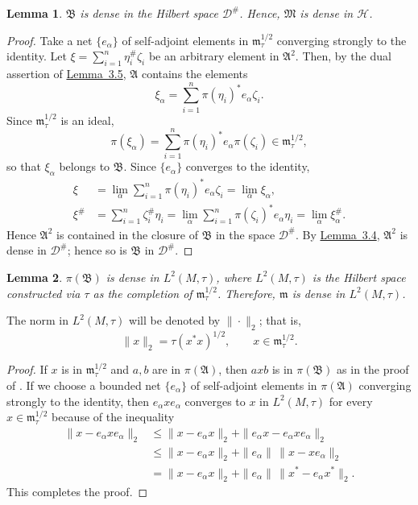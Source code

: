 \documentclass[12pt,b5paper,twoside]{article}
\theoremstyle{takesaki}
\newtheorem{lemma}{Lemma}[section]
\numberwithin{equation}{section}
\begin{document}
\begin{lemma}\label{lem:14.7}
$\mathfrak B$ is dense in the Hilbert space $\mathcal D^{\#}$.
Hence, $\mathfrak M$ is dense in $\mathcal H$.
\end{lemma}

\begin{proof}
Take a net $\{e_\alpha\}$ of self-adjoint elements in
$\mathfrak m_\tau^{1/2}$ converging strongly to the identity.  Let
$\xi=\sum_{i=1}^{n}\eta_i^{\#}\zeta_i$ be an arbitrary element in
$\mathfrak A^2$.  Then, by the dual assertion of
\hyperref[lem:3.5]{Lemma~3.5},
$\mathfrak A$ contains the elements
\[
 \xi_\alpha=\sum_{i=1}^{n}\pi(\eta_i)^*e_\alpha\zeta_i.
\]
Since $\mathfrak m_\tau^{1/2}$ is an ideal,
\[
 \pi(\xi_\alpha)
 =\sum_{i=1}^{n}\pi(\eta_i)^*e_\alpha\pi(\zeta_i)
 \in\mathfrak m_\tau^{1/2},
\]
so that $\xi_\alpha$ belongs to $\mathfrak B$.  Since
$\{e_\alpha\}$ converges to the identity,
\begin{align*}
 \xi
 &=\lim_\alpha\sum_{i=1}^{n}\pi(\eta_i)^*e_\alpha\zeta_i
  =\lim_\alpha\xi_\alpha,\\
 \xi^{\#}
 &=\sum_{i=1}^{n}\zeta_i^{\#}\eta_i
  =\lim_\alpha\sum_{i=1}^{n}\pi(\zeta_i)^*e_\alpha\eta_i
  =\lim_\alpha\xi_\alpha^{\#}.
\end{align*}
Hence $\mathfrak A^2$ is contained in the closure of $\mathfrak B$ in
the space $\mathcal D^{\#}$.  By
\hyperref[lem:3.4]{Lemma~3.4}, $\mathfrak A^2$ is dense in
$\mathcal D^{\#}$; hence so is $\mathfrak B$ in
$\mathcal D^{\#}$.
\end{proof}

\begin{lemma}\label{lem:14.8}
$\pi(\mathfrak B)$ is dense in $L^2(M,\tau)$, where $L^2(M,\tau)$ is
the Hilbert space constructed via $\tau$ as the completion of
$\mathfrak m_\tau^{1/2}$.  Therefore, $\mathfrak m$ is dense in
$L^2(M,\tau)$.
\end{lemma}

The norm in $L^2(M,\tau)$ will be denoted by $\|\cdot\|_2$; that is,
\[
 \|x\|_2=\tau(x^*x)^{1/2},
 \qquad x\in\mathfrak m_\tau^{1/2}.
\]

\begin{proof}
If $x$ is in $\mathfrak m_\tau^{1/2}$ and $a,b$ are in
$\pi(\mathfrak A)$, then $axb$ is in $\pi(\mathfrak B)$ as in the
proof of .  If we choose a bounded net
$\{e_\alpha\}$ of self-adjoint elements in $\pi(\mathfrak A)$
converging strongly to the identity, then $e_\alpha xe_\alpha$
converges to $x$ in $L^2(M,\tau)$ for every
$x\in\mathfrak m_\tau^{1/2}$ because of the inequality
\begin{align*}
 \|x-e_\alpha xe_\alpha\|_2
 &\leq\|x-e_\alpha x\|_2
     +\|e_\alpha x-e_\alpha xe_\alpha\|_2\\
 &\leq\|x-e_\alpha x\|_2
     +\|e_\alpha\|\,\|x-xe_\alpha\|_2\\
 &=\|x-e_\alpha x\|_2
     +\|e_\alpha\|\,\|x^*-e_\alpha x^*\|_2.
\end{align*}
This completes the proof.
\end{proof}
\end{document}
